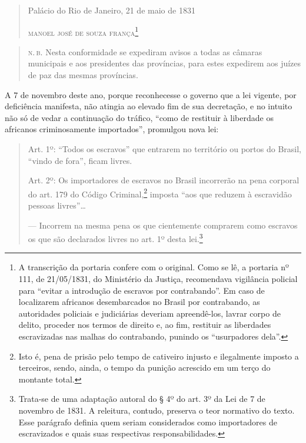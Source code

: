 {\begin{quote}
\medskip

\hfill{} Palácio do Rio de Janeiro, 21 de maio de 1831

\hfill\textsc{manoel josé de souza frança}\footnote{A transcrição da portaria
  confere com o original. Como se lê, a portaria nº 111, de 21/05/1831,
  do Ministério da Justiça, recomendava vigilância policial para ``evitar
  a introdução de escravos por contrabando''. Em caso de localizarem
  africanos desembarcados no Brasil por contrabando, as autoridades
  policiais e judiciárias deveriam apreendê-los, lavrar corpo de
  delito, proceder nos termos de direito e, ao fim, restituir as
  liberdades escravizadas nas malhas do contrabando, punindo os
  ``usurpadores dela''.}
\end{quote}

\begin{quote}
\textsc{n.\,b.} Nesta conformidade se expediram avisos a todas as câmaras
municipais e aos presidentes das províncias, para estes expedirem aos
juízes de paz das mesmas províncias.
\end{quote}

A 7 de novembro deste ano, porque reconhecesse o governo que a lei
vigente, por deficiência manifesta, não atingia ao elevado fim de sua
decretação, e no intuito não só de vedar a continuação do tráfico, ``como
de restituir à liberdade os africanos criminosamente importados'',
promulgou nova lei:

\begin{quote}
Art. 1º: ``Todos os escravos'' que entrarem no território ou portos do
Brasil, ``vindo de fora'', ficam livres.

Art. 2º: Os importadores de escravos no Brasil incorrerão na pena
corporal do art. 179 do Código Criminal,\footnote{Isto é, pena de
  prisão pelo tempo de cativeiro injusto e ilegalmente imposto a
  terceiros, sendo, ainda, o tempo da punição acrescido em um terço do
  montante total.} imposta ``aos que reduzem à escravidão pessoas
livres''\ldots{}

--- Incorrem na mesma pena os que cientemente comprarem como escravos os
que são declarados livres no art. 1º desta lei.\footnote{Trata-se de
  uma adaptação autoral do § 4º do art. 3º da Lei de 7 de novembro de
  1831. A releitura, contudo, preserva o teor normativo do texto. Esse
  parágrafo definia quem seriam considerados como
  importadores de escravizados e quais suas respectivas
  responsabilidades.}
\end{quote}

}
